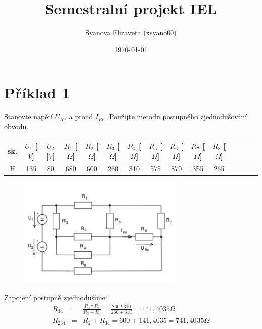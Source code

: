 \documentclass[a4paper,oneside,12pt]{article}
\author{Syanova Elizaveta (xsyano00)}
\date{\today}
\title{Semestralní projekt IEL}
\begin{document}
	\maketitle
	\tableofcontents
    
	\newpage

	\section{Příklad 1}
	\maketitle


	Stanovte napětí $U_{R6}$ a proud $I_{R6}$. Použijte metodu postupného
	zjednodušování obvodu.

	\begin{table}[h]
		\begin{center}
			\begin{tabular}{|c|c|c|c|c|c|c|c|c|c|c|c|c|c|c|}
				\hline
				sk. & $U_{1}$ [$V$] & $U_{2}$ [$V$] & $R_{1}$ [$\Omega$] & $R_{2}$ [$\Omega$] & $R_{3}$ [$\Omega$] & $R_{4}$ [$\Omega$] & $R_{5}$ [$\Omega$] & $R_{6}$ [$\Omega$] & $R_{7}$ [$\Omega$] & $R_{8}$ [$\Omega$] \\
				\hline
				H & 135 & 80 & 680 & 600 & 260 & 310 & 575 & 870 & 355 & 265 \\
				\hline
			\end{tabular}
		\end{center}
	\end{table}

	\begin{figure}[h]
		\begin{center}
			\includegraphics[width=8cm,keepaspectratio]{images/1_img.png}
		\end{center}
	\end{figure}

	Zapojení postupně zjednodušíme:
	\begin{eqnarray*}
		R_{34} &= & \frac{R_{3} * R_{4}}{R_{3} + R_{4}} = \frac{260 * 310}{260 + 310} = 141,4035\Omega\\
		R_{234} &= & R_{2} + R_{34} = 600 + 141,4035 = 741,4035 \Omega\\
	\end{eqnarray*}
\end{document}
